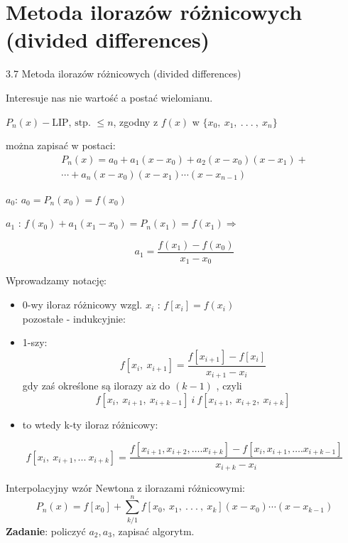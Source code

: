 \section{Metoda ilorazów różnicowych (divided differences)}
\begin{frame}
{3.7 Metoda ilorazów różnicowych (divided differences)}

Interesuje nas nie wartość a postać wielomianu.

$P_{n}(x)-\text{LIP, stp. } \leq n$, zgodny z $f(x)$ w $\{x_{0},\ x_{1},\ .\ .\ .\ ,\ x_{n}\}$

można zapisać w postaci:
\begin{equation*}\begin{split}
P_{n}(x)=a_{0}+a_{1}(x-x_{0})+a_{2}(x-x_{0})(x-x_{1})+ \\
\cdots+a_{n}(x-x_{0})(x-x_{1})\cdots(x-x_{n-1})
\end{split}
\end{equation*}

$a_{0}$: $a_{0}=P_{n}(x_{0})=f(x_{0})$

$a_{1}$ : $f(x_{0})+a_{1}(x_{1}-x_{0})=P_{n}(x_{1})=f(x_{1}) \Rightarrow$

$$
a_{1}=\frac{f(x_{1})-f(x_{0})}{x_{1}-x_{0}}
$$
\end{frame}

\begin{frame}
Wprowadzamy notację:
\begin{itemize}
\item 0-wy iloraz różnicowy wzgl. $x_{i}$ : $f[x_{i}]=f(x_{i})$ \\
pozostałe - indukcyjnie:

\item 1-szy:
$$
f[x_{i},\ x_{i+1}]=\frac{f[x_{i+1}]-f[x_{i}]}{x_{i+1}-x_{i}}
$$
gdy zaś określone są ilorazy $\mathrm{a}_{}\dot{\mathrm{z}}$ do $(k-1)$ , czyli
$$
f[x_{i},\ x_{i+1},\ x_{i+k-1}] \: i \: f[x_{i+1},\ x_{i+2},\ x_{i+k}]
$$
\item to wtedy k-ty iloraz różnicowy:
\end{itemize}
$$
f[x_{i},\ x_{i+1}, ...\ x_{i+k}]=\frac{f[x_{i+1},x_{i+2},\ldots.x_{i+k}]-f[x_{i},x_{i+1},\ldots.x_{i+k-1}]}{x_{i+k}-x_{i}}
$$
\end{frame}

\begin{frame}
Interpolacyjny wzór Newtona z ilorazami różnicowymi:
$$
P_{n}(x)=f[x_{0}]+\sum_{k/1}^{n}f[x_{0},\ x_{1},\ .\ .\ .\ ,\ x_{k}](x-x_{0})\cdots(x-x_{k-1})
$$
\textbf{Zadanie}: policzyć $a_{2}, a_{3}$, zapisać algorytm.

\end{frame}

